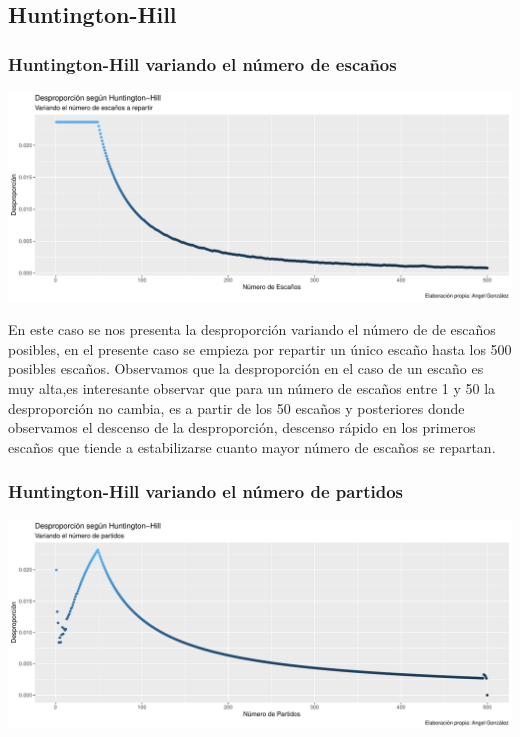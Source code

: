 \documentclass[12pt,a4paper,]{book}
\numberwithin{dummy}{section}
\theoremstyle{ocrenumbox}
\theoremstyle{blacknumex}
\theoremstyle{blacknumbox}
\theoremstyle{ocrenum}
\theoremstyle{ocrenum}
\begin{document}
\hypertarget{huntington-hill}{%
\subsection{Huntington-Hill}\label{huntington-hill}}

\hypertarget{huntington-hill-variando-el-nuxfamero-de-escauxf1os}{%
\subsubsection{Huntington-Hill variando el número de
escaños}\label{huntington-hill-variando-el-nuxfamero-de-escauxf1os}}

\begin{center}\includegraphics[width=0.95\linewidth]{figurasR/unnamed-chunk-29-1} \end{center}

En este caso se nos presenta la desproporción variando el número de de
escaños posibles, en el presente caso se empieza por repartir un único
escaño hasta los 500 posibles escaños. Observamos que la desproporción
en el caso de un escaño es muy alta,es interesante observar que para un
número de escaños entre 1 y 50 la desproporción no cambia, es a partir
de los 50 escaños y posteriores donde observamos el descenso de la
desproporción, descenso rápido en los primeros escaños que tiende a
estabilizarse cuanto mayor número de escaños se repartan.

\hypertarget{huntington-hill-variando-el-nuxfamero-de-partidos}{%
\subsubsection{Huntington-Hill variando el número de
partidos}\label{huntington-hill-variando-el-nuxfamero-de-partidos}}

\begin{center}\includegraphics[width=0.95\linewidth]{figurasR/unnamed-chunk-30-1} \end{center}
\end{document}
